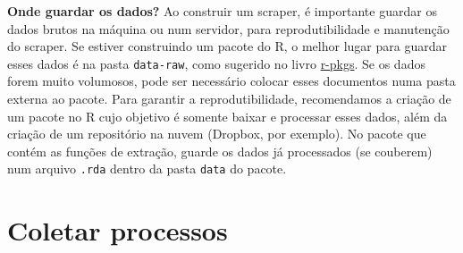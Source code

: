\documentclass[]{book}
\newenvironment{Shaded}{\begin{snugshade}}{\end{snugshade}}
\newcommand{\KeywordTok}[1]{\textcolor[rgb]{0.13,0.29,0.53}{\textbf{{#1}}}}
\newcommand{\DataTypeTok}[1]{\textcolor[rgb]{0.13,0.29,0.53}{{#1}}}
\newcommand{\DecValTok}[1]{\textcolor[rgb]{0.00,0.00,0.81}{{#1}}}
\newcommand{\StringTok}[1]{\textcolor[rgb]{0.31,0.60,0.02}{{#1}}}
\newcommand{\CommentTok}[1]{\textcolor[rgb]{0.56,0.35,0.01}{\textit{{#1}}}}
\newcommand{\NormalTok}[1]{{#1}}
\begin{document}
\begin{Shaded}
\end{Shaded}

\textbf{Onde guardar os dados?} Ao construir um scraper, é importante
guardar os dados brutos na máquina ou num servidor, para
reprodutibilidade e manutenção do scraper. Se estiver construindo um
pacote do R, o melhor lugar para guardar esses dados é na pasta
\texttt{data-raw}, como sugerido no livro
\href{http://r-pkgs.had.co.nz}{r-pkgs}. Se os dados forem muito
volumosos, pode ser necessário colocar esses documentos numa pasta
externa ao pacote. Para garantir a reprodutibilidade, recomendamos a
criação de um pacote no R cujo objetivo é somente baixar e processar
esses dados, além da criação de um repositório na nuvem (Dropbox, por
exemplo). No pacote que contém as funções de extração, guarde os dados
já processados (se couberem) num arquivo \texttt{.rda} dentro da pasta
\texttt{data} do pacote.

\section{Coletar processos}\label{coletar-processos}
\end{document}
